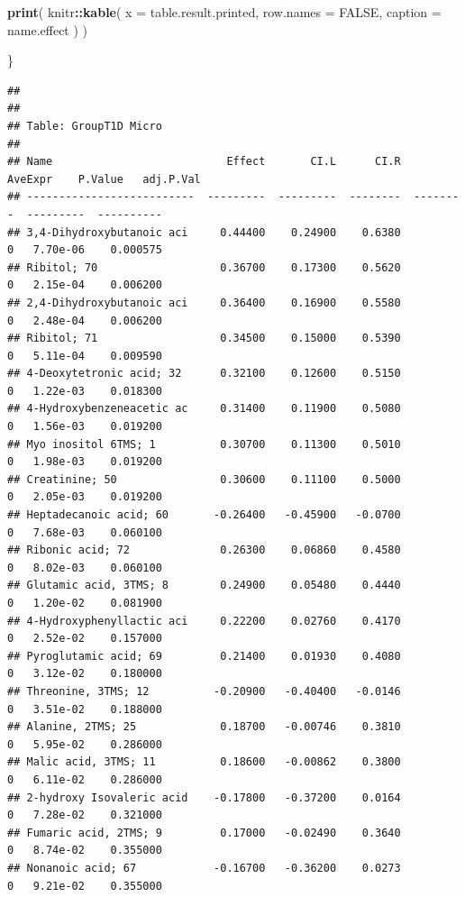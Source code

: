 \documentclass[]{article}
\newenvironment{Shaded}{\begin{snugshade}}{\end{snugshade}}
\newcommand{\DataTypeTok}[1]{\textcolor[rgb]{0.13,0.29,0.53}{#1}}
\newcommand{\KeywordTok}[1]{\textcolor[rgb]{0.13,0.29,0.53}{\textbf{#1}}}
\newcommand{\NormalTok}[1]{#1}
\newcommand{\OperatorTok}[1]{\textcolor[rgb]{0.81,0.36,0.00}{\textbf{#1}}}
\newcommand{\OtherTok}[1]{\textcolor[rgb]{0.56,0.35,0.01}{#1}}
\begin{document}
\begin{Shaded}
\begin{Highlighting}[]
  \KeywordTok{print}\NormalTok{( }
\NormalTok{    knitr}\OperatorTok{::}\KeywordTok{kable}\NormalTok{( }
      \DataTypeTok{x =}\NormalTok{ table.result.printed,}
      \DataTypeTok{row.names =} \OtherTok{FALSE}\NormalTok{,}
      \DataTypeTok{caption =}\NormalTok{ name.effect}
\NormalTok{    )}
\NormalTok{  )}
  
\NormalTok{\}}
\end{Highlighting}
\end{Shaded}

\begin{verbatim}
## 
## 
## Table: GroupT1D Micro
## 
## Name                           Effect       CI.L      CI.R   AveExpr    P.Value   adj.P.Val
## --------------------------  ---------  ---------  --------  --------  ---------  ----------
## 3,4-Dihydroxybutanoic aci     0.44400    0.24900    0.6380         0   7.70e-06    0.000575
## Ribitol; 70                   0.36700    0.17300    0.5620         0   2.15e-04    0.006200
## 2,4-Dihydroxybutanoic aci     0.36400    0.16900    0.5580         0   2.48e-04    0.006200
## Ribitol; 71                   0.34500    0.15000    0.5390         0   5.11e-04    0.009590
## 4-Deoxytetronic acid; 32      0.32100    0.12600    0.5150         0   1.22e-03    0.018300
## 4-Hydroxybenzeneacetic ac     0.31400    0.11900    0.5080         0   1.56e-03    0.019200
## Myo inositol 6TMS; 1          0.30700    0.11300    0.5010         0   1.98e-03    0.019200
## Creatinine; 50                0.30600    0.11100    0.5000         0   2.05e-03    0.019200
## Heptadecanoic acid; 60       -0.26400   -0.45900   -0.0700         0   7.68e-03    0.060100
## Ribonic acid; 72              0.26300    0.06860    0.4580         0   8.02e-03    0.060100
## Glutamic acid, 3TMS; 8        0.24900    0.05480    0.4440         0   1.20e-02    0.081900
## 4-Hydroxyphenyllactic aci     0.22200    0.02760    0.4170         0   2.52e-02    0.157000
## Pyroglutamic acid; 69         0.21400    0.01930    0.4080         0   3.12e-02    0.180000
## Threonine, 3TMS; 12          -0.20900   -0.40400   -0.0146         0   3.51e-02    0.188000
## Alanine, 2TMS; 25             0.18700   -0.00746    0.3810         0   5.95e-02    0.286000
## Malic acid, 3TMS; 11          0.18600   -0.00862    0.3800         0   6.11e-02    0.286000
## 2-hydroxy Isovaleric acid    -0.17800   -0.37200    0.0164         0   7.28e-02    0.321000
## Fumaric acid, 2TMS; 9         0.17000   -0.02490    0.3640         0   8.74e-02    0.355000
## Nonanoic acid; 67            -0.16700   -0.36200    0.0273         0   9.21e-02    0.355000

\end{verbatim}
\end{document}
